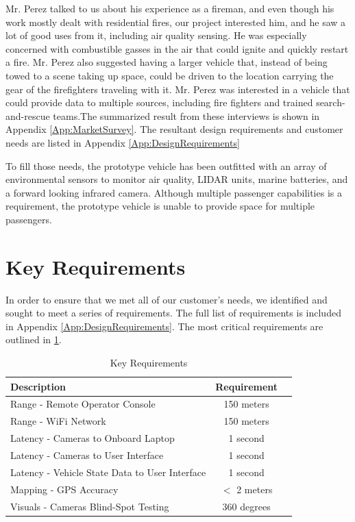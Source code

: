 Mr. Perez talked to us about his experience as a fireman, and even though his work mostly dealt with residential fires, our project interested him, and he saw a lot of good uses from it, including air quality sensing. He was especially concerned with combustible gasses in the air that could ignite and quickly restart a fire. Mr. Perez also suggested having a larger vehicle that, instead of being towed to a scene taking up space, could be driven to the location carrying the gear of the firefighters traveling with it. Mr. Perez was interested in a vehicle that could provide data to multiple sources, including fire fighters and trained search-and-rescue teams.The summarized result from these interviews is shown in Appendix \ref{App:MarketSurvey}. The resultant design requirements and customer needs are listed in Appendix \ref{App:DesignRequirements} 

To fill those needs, the prototype vehicle has been outfitted with an array of environmental sensors to monitor air quality, LIDAR units, marine batteries, and a forward looking infrared camera. Although multiple passenger capabilities is a requirement, the prototype vehicle is unable to provide space for multiple passengers.

\section{Key Requirements}
In order to ensure that we met all of our customer's needs, we identified and sought to meet a series of requirements. The full list of requirements is included in Appendix \ref{App:DesignRequirements}. The most critical requirements are outlined in \ref{table:key_reqs}.

\begin{table}[ht]
	\centering
	\begin{tabular}{ l | c | r }
		Description & Requirement  \\ \hline
		Range - Remote Operator Console & 150 meters  \\
		Range - WiFi Network & 150 meters \\
		Latency - Cameras to Onboard Laptop & 1 second \\
		Latency - Cameras to User Interface & 1 second \\
		Latency - Vehicle State Data to User Interface & 1 second \\
		Mapping - GPS Accuracy & $<$ 2 meters \\
		Visuals - Cameras Blind-Spot Testing & 360 degrees \\
	\end{tabular}
	\caption{Key Requirements}
	\label{table:key_reqs}
\end{table}

